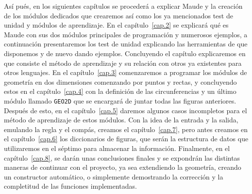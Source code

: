 Así pués, en los siguientes capítulos se procederá a explicar Maude y la creación de los módulos dedicados que crearemos así como los ya mencionados test de unidad y módulos de aprendizaje. En el capítulo~\ref{cap.2} se explicará qué es Maude con sus dos módulos principales de programación y numerosos ejemplos, a continuación presentaremos los test de unidad explicando las herramientas de que disponemos y de nuevo dando ejemplos. Concluyendo el capítulo explicaremos en que consiste el método de aprendizaje y su relación con otros ya existentes para otros lenguajes. En el capítulo~\ref{cap.3} comenzaremos a programar los módulos de geometría en dos dimensiones comenzando por puntos y rectas, y concluyendo estos en el capítulo~\ref{cap.4} con la definición de las circunferencias y un último módulo llamado \texttt{GEO2D} que se encargará de juntar todas las figuras anteriores. Después de esto, en el capítulo~\ref{cap.5} daremos algunos casos incompletos para el método de aprendizaje de estos módulos. Con la idea de la entrada y la salida, emulando la regla y el compás, creamos el capítulo~\ref{cap.7}, pero antes creamos en el capítulo~\ref{cap.6} los diccionarios de figuras, que serán la estructura de datos que utilizaremos en el séptimo para almacenar la información. Finalmente, en el capítulo~\ref{cap.8}, se darán unas conclusiones finales y se expondrán las distintas maneras de continuar con el proyecto, ya sea extendiendo la geometría, creando un constructor automático, o simplemente demostrando la corrección y la completitud de las funciones implementadas.\par
